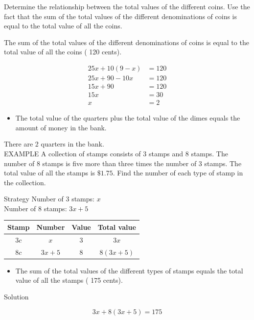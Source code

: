 \documentclass{ximera}
\begin{document}
Determine the relationship between the total values of the different coins. Use the fact that the sum of the total values of the different denominations of coins is equal to the total value of all the coins.

The sum of the total values of the different denominations of coins is equal to the total value of all the coins ( 120 cents).

$$\begin{aligned}
25 x+10(9-x) & =120 \\
25 x+90-10 x & =120 \\
15 x+90 & =120 \\
15 x & =30 \\
x & =2
\end{aligned}$$

\begin{itemize}
  \item The total value of the quarters plus the total value of the dimes equals the amount of money in the bank.
\end{itemize}

There are 2 quarters in the bank.\\
EXAMPLE A collection of stamps consists of 3\textcent{} stamps and 8\textcent{} stamps. The number of 8\textcent{} stamps is five more than three times the number of 3\textcent{} stamps. The total value of all the stamps is $\$ 1.75$. Find the number of each type of stamp in the collection.

Strategy Number of 3\textcent{} stamps: $x$\\
Number of 8\textcent{} stamps: $3 x+5$

\begin{center}
\begin{tabular}{c|c|c|c}
Stamp & Number & Value & Total value \\
\hline
$3 c$ & $x$ & 3 & $3 x$ \\
\hline
$8 c$ & $3 x+5$ & 8 & $8(3 x+5)$ \\
\hline
\end{tabular}
\end{center}

\begin{itemize}
  \item The sum of the total values of the different types of stamps equals the total value of all the stamps ( 175 cents).
\end{itemize}

Solution

$$3 x+8(3 x+5)=175$$
\end{document}
